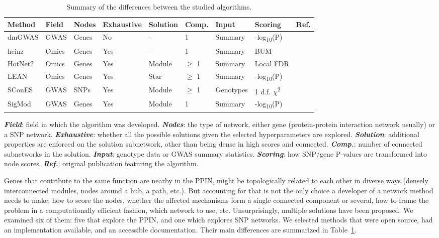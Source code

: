 \documentclass[twocolumn, 11pt]{article}
\begin{document}
\begin{table}[htbp]
  \caption{\label{tab:method_comparison} Summary of the differences between the studied algorithms.}
  \centering
  \begin{threeparttable}
    \begin{tabular}{l|llllllll}
      Method & Field & Nodes & Exhaustive & Solution & Comp. & Input & Scoring & Ref.\\
      \hline
      dmGWAS & GWAS & Genes & No & - & 1 & Summary & -log\textsubscript{10}(P) & \cite{jia_dmgwas:_2011}\\
      heinz & Omics & Genes & Yes & - & 1 & Summary & BUM & \cite{dittrich_identifying_2008}\\
      HotNet2 & Omics & Genes & Yes & Module & \(\ge\) 1 & Summary & Local FDR & \cite{leiserson_pan-cancer_2015}\\
      LEAN & Omics & Genes & Yes & Star & \(\ge\) 1 & Summary & -log\textsubscript{10}(P) & \cite{gwinner_network-based_2016}\\
      SConES & GWAS & SNPs & Yes & Module & \(\ge\) 1 & Genotypes & 1 d.f. \(\chi\)\textsuperscript{2} & \cite{azencott_efficient_2013}\\
      SigMod & GWAS & Genes & Yes & Module & 1 & Summary & -log\textsubscript{10}(P) & \cite{liu_sigmod:_2017}\\
    \end{tabular}
    \begin{tablenotes}
      \footnotesize{
        \item \textbf{\emph{Field}}: field in which the algorithm was developed. \textbf{\emph{Nodes}}: the type of network, either gene (protein-protein interaction network usually) or a SNP network. \textbf{\emph{Exhaustive}}: whether all the possible solutions given the selected hyperparameters are explored. \textbf{\emph{Solution}}: additional properties are enforced on the solution subnetwork, other than being dense in high scores and connected. \textbf{\emph{Comp.}}: number of connected subnetworks in the solution. \textbf{\emph{Input}}: genotype data or GWAS summary statistics. \textbf{\emph{Scoring}}: how SNP/gene P-values are transformed into node scores. \textbf{\emph{Ref.}}: original publication featuring the algorithm.
      }
    \end{tablenotes}
  \end{threeparttable}
\end{table}

Genes that contribute to the same function are nearby in the PPIN, might be topologically related to each other in diverse ways (densely interconnected modules, nodes around a hub, a path, etc.). But accounting for that is not the only choice a developer of a network method needs to make: how to score the nodes, whether the affected mechanisms form a single connected component or several, how to frame the problem in a computationally efficient fashion, which network to use, etc. Unsurprisingly, multiple solutions have been proposed. We examined six of them: five that explore the PPIN, and one which explores SNP networks. We selected methods that were open source, had an implementation available, and an accessible documentation. Their main differences are summarized in Table~\ref{tab:method_comparison}.
\end{document}
